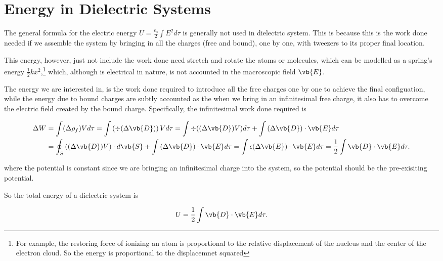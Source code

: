 \documentclass[english,a4paper,12pt]{report}
\begin{document}
\section{Energy in Dielectric Systems}

The general formula for the electric energy \(\displaystyle U = \frac{\epsilon _{0} }{2} \int E^2d\tau  \) is generally not used in dielectric system. This is because this is the work done needed if we assemble the system by bringing in all the charges (free and bound), one by one, with tweezers to its proper final location. 

This energy, however, just not include the work done need stretch and rotate the atoms or molecules, which can be modelled as a spring's energy \(\displaystyle \frac{1}{2}kx^2 \),\footnote{For example, the restoring force of ionizing an atom is proportional to the relative displacement of the nucleus and the center of the electron cloud. So the energy is proportional to the displacemnet squared} which, although is electrical in nature, is not accounted in the macroscopic field \(\vb{E} \). 

The energy we are interested in, is the work done required to introduce all the free charges one by one to achieve the final configuation, while the energy due to bound charges are subtly accounted as the when we bring in an infinitesimal free charge, it also has to overcome the electric field created by the bound charge. Specifically, the infinitesimal work done required is 

\begin{equation}
    \begin{aligned} 
    \Delta W &= \int (\Delta \rho _{f} ) V d\tau = \int \left( \div{(\Delta \vb{D} )}  \right) Vd\tau = \int \div{\left( (\Delta \vb{D} ) V\right)} d\tau + \int \left( \Delta \vb{D}  \right) \cdot \vb{E} d\tau \\
    &= \oint_{S} \left( (\Delta \vb{D} )V \right) \cdot d\vb{S} + \int \left( \Delta \vb{D}  \right) \cdot \vb{E} d\tau = \int \epsilon (\Delta \vb{E} )\cdot \vb{E} d\tau = \frac{1}{2}\int \vb{D} \cdot \vb{E} d\tau . 
    \end{aligned} 
\end{equation}

where the potential is constant since we are bringing an infinitesimal charge into the system, so the potential should be the pre-exisiting potential.

So the total energy of a dielectric system is 

\begin{equation}
    U = \frac{1}{2} \int \vb{D} \cdot \vb{E} d\tau  .
\end{equation}
\end{document}
